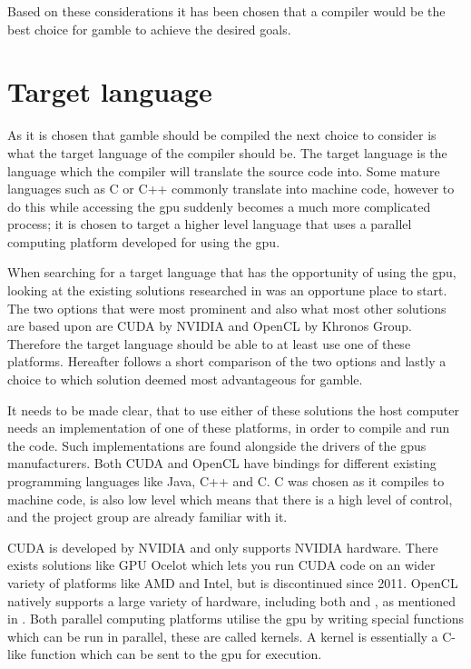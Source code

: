 Based on these considerations it has been chosen that a compiler would be the best choice for \gls{gamble} to achieve the desired goals.

\section{Target language}\label{CUDAvsOpenCL}
As it is chosen that \gls{gamble} should be compiled the next choice to consider is what the target language of the compiler should be.
The target language is the language which the compiler will translate the source code into.
Some mature languages such as C or C++ commonly translate into machine code, however to do this while accessing the \acrshort{gpu} suddenly becomes a much more complicated process; it is chosen to target a higher level language that uses a parallel computing platform developed for using the \acrshort{gpu}.

When searching for a target language that has the opportunity of using the \acrshort{gpu}, looking at the existing solutions researched in  was an opportune place to start.
The two options that were most prominent and also what most other solutions are based upon are CUDA by NVIDIA and OpenCL by Khronos Group.
Therefore the target language should be able to at least use one of these platforms. 
Hereafter follows a short comparison of the two options and lastly a choice to which solution deemed most advantageous for \gls{gamble}.

It needs to be made clear, that to use either of these solutions the host computer needs an implementation of one of these platforms, in order to compile and run the code.
Such implementations are found alongside the drivers of the \gls{gpus} manufacturers.
Both CUDA and OpenCL have bindings for different existing programming languages like Java, C++ and C.
C was chosen as it compiles to machine code, is also low level which means that there is a high level of control, and the project group are already familiar with it. 

CUDA is developed by NVIDIA and only supports NVIDIA hardware.
There exists solutions like GPU Ocelot which lets you run CUDA code on an wider variety of platforms like AMD and Intel, but is discontinued since 2011. \citep{Diamos:2010:ODO:1854273.1854318}
OpenCL natively supports a large variety of hardware, including both  and , as mentioned in .
Both parallel computing platforms utilise the \acrshort{gpu} by writing special functions which can be run in parallel, these are called kernels.
A kernel is essentially a C-like function which can be sent to the \acrshort{gpu} for execution.

